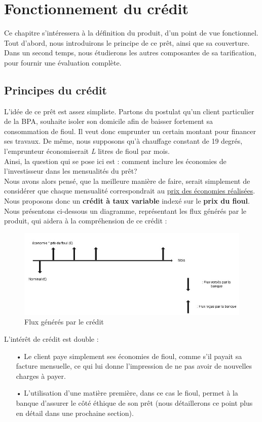 \documentclass[10pt,a4paper]{article}
\begin{document}
\section{Fonctionnement du crédit}
Ce chapitre s'intéressera à la définition du produit, d'un point de vue fonctionnel. Tout d'abord, nous introduirons le principe de ce prêt, ainsi que sa couverture. Dans un second temps, nous étudierons les autres composantes de sa tarification, pour fournir une évaluation complète.
\subsection{Principes du crédit}
L'idée de ce prêt est assez simpliste. Partons du postulat qu'un client particulier de la BPA, souhaite isoler son domicile afin de baisser fortement sa consommation de fioul. Il veut donc emprunter un certain montant pour financer ses travaux. De même, nous supposons qu'à chauffage constant de 19 degrés, l'emprunteur économiserait \textit{L} litres de fioul par mois. \\ Ainsi, la question qui se pose ici est : comment inclure les économies de l'investisseur dans les mensualités du prêt? \\
Nous avons alors pensé, que la meilleure manière de faire, serait simplement de considérer que chaque mensualité correspondrait au \underline{prix des économies réalisées}. \\
Nous proposons donc un \textbf{crédit à taux variable} indexé sur le \textbf{prix du fioul}. \\
Nous présentons ci-dessous un diagramme, représentant les flux générés par le produit, qui aidera à la compréhension de ce crédit : 
\begin{figure}[h!]
\begin{center}
\includegraphics[scale=0.5]{flux.jpg}
\caption{Flux générés par le crédit}
\end{center}
\end{figure}
\vspace{2mm}
L'intérêt de crédit est double : 
\begin{itemize}
\item[•] Le client paye simplement ses économies de fioul, comme s'il payait sa facture mensuelle, ce qui lui donne l'impression de ne pas avoir de nouvelles charges à payer.
\item[•] L'utilisation d'une matière première, dans ce cas le fioul, permet à la banque d'assurer le côté éthique de son prêt (nous détaillerons ce point plus en détail dans une prochaine section).
\end{itemize}
\vspace{5mm}
\end{document}
